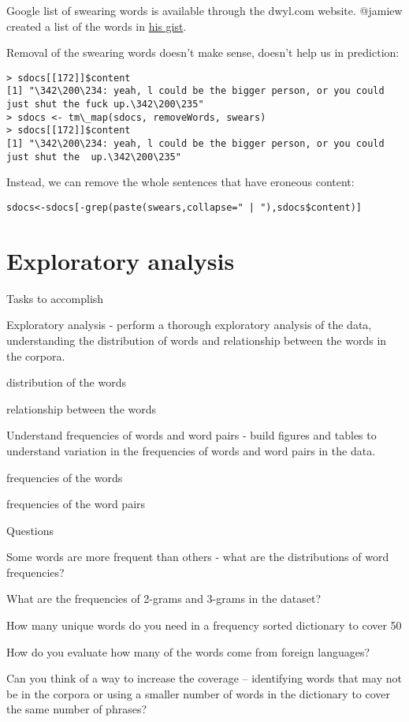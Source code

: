 \documentclass{article}
\begin{document}
Google list of swearing words is available through the dwyl.com website. @jamiew created a list of the words in \href{https://gist.github.com/jamiew/1112488}{his gist}.

Removal of the swearing words doesn't make sense, doesn't help us in prediction:

\begin{lstlisting}
> sdocs[[172]]$content
[1] "\342\200\234: yeah, l could be the bigger person, or you could just shut the fuck up.\342\200\235"
> sdocs <- tm\_map(sdocs, removeWords, swears)
> sdocs[[172]]$content
[1] "\342\200\234: yeah, l could be the bigger person, or you could just shut the  up.\342\200\235"
\end{lstlisting}

Instead, we can remove the whole sentences that have eroneous content:

\begin{lstlisting}
sdocs<-sdocs[-grep(paste(swears,collapse=" | "),sdocs$content)]
\end{lstlisting}


\section{Exploratory analysis}

Tasks to accomplish

Exploratory analysis - perform a thorough exploratory analysis of the data, understanding the distribution of words and relationship between the words in the corpora.

distribution of the words

relationship between the words
 
Understand frequencies of words and word pairs - build figures and tables to understand variation in the frequencies of words and word pairs in the data.

frequencies of the words

frequencies of the word pairs

Questions

Some words are more frequent than others - what are the distributions of word frequencies? 

What are the frequencies of 2-grams and 3-grams in the dataset? 

How many unique words do you need in a frequency sorted dictionary to cover 50%

How do you evaluate how many of the words come from foreign languages? 

Can you think of a way to increase the coverage -- identifying words that may not be in the corpora or using a smaller number of words in the dictionary to cover the same number of phrases?
\end{document}
